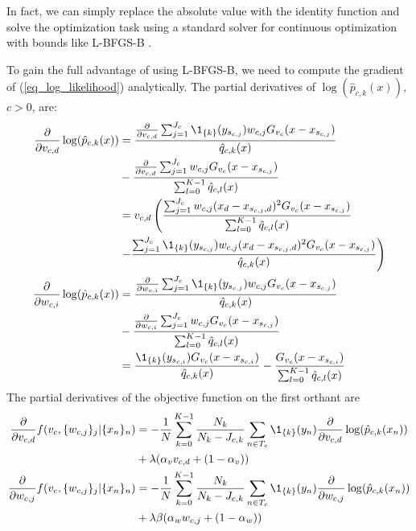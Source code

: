 In fact, we can simply replace the absolute value with the identity function and solve the optimization task using a standard solver for continuous optimization with bounds like L-BFGS-B \cite{Byrd_95}.\par
%
To gain the full advantage of using L-BFGS-B, we need to compute the gradient of (\ref{eq_log_likelihood}) analytically.
The partial derivatives of $\log(\hat{p}_{c,k}(x))$, $c>0$, are:
%
\begin{align}
\frac{\partial}{\partial v_{c,d}}\log(\hat{p}_{c,k}(x))&
=\frac{\frac{\partial}{\partial v_{c,d}}
\sum_{j=1}^{J_c}\1_{\{k\}}(y_{s_{c,j}})w_{c,j}G_{v_c}(x-x_{s_{c,j}})}
{\hat{q}_{c,k}(x)}
\label{eq_p_partial_v}\\
&-\frac{\frac{\partial}{\partial v_{c,d}}
\sum_{j=1}^{J_c}w_{c,j}G_{v_c}(x-x_{s_{c,j}})}
{\sum_{l=0}^{K-1}\hat{q}_{c,l}(x)}\notag\\
&=v_{c,d}\left(\frac{\sum_{j=1}^{J_c}w_{c,j}
(x_d-x_{s_{c,j},d})^2G_{v_c}(x-x_{s_{c,j}})}
{\sum_{l=0}^{K-1}\hat{q}_{c,l}(x)}\right.\notag\\
&\left.-\frac{\sum_{j=1}^{J_c}\1_{\{k\}}(y_{s_{c,j}})w_{c,j}
(x_d-x_{s_{c,j},d})^2G_{v_c}(x-x_{s_{c,j}})}
{\hat{q}_{c,k}(x)}\right)\notag\\
\frac{\partial}{\partial w_{c,i}}\log(\hat{p}_{c,k}(x))&
=\frac{\frac{\partial}{\partial w_{c,i}}
\sum_{j=1}^{J_c}\1_{\{k\}}(y_{s_{c,j}})w_{c,j}G_{v_c}(x-x_{s_{c,j}})}
{\hat{q}_{c,k}(x)}
\label{eq_p_partial_w}\\
&-\frac{\frac{\partial}{\partial w_{c,i}}
\sum_{j=1}^{J_c}w_{c,j}G_{v_c}(x-x_{s_{c,j}})}
{\sum_{l=0}^{K-1}\hat{q}_{c,l}(x)}\notag\\
&=\frac{\1_{\{k\}}(y_{s_{c,i}})G_{v_c}(x-x_{s_{c,i}})}
{\hat{q}_{c,k}(x)}
-\frac{G_{v_c}(x-x_{s_{c,i}})}
{\sum_{l=0}^{K-1}\hat{q}_{c,l}(x)}\notag
\end{align}
%
The partial derivatives of the objective function on the first orthant are
%
\begin{align}
\frac{\partial}{\partial v_{c,d}}f(v_c,\{w_{c,j}\}_j|\{x_n\}_n)
&=-\frac{1}{N}\sum_{k=0}^{K-1}\frac{N_k}{N_k-J_{c,k}}\sum_{n\in T_c}
\1_{\{k\}}(y_n)\frac{\partial}{\partial v_{c,d}}\log(\hat{p}_{c,k}(x_n))
\label{eq_l_partial_v}\\
&+\lambda(\alpha_v v_{c,d}+(1-\alpha_v))\notag\\
\frac{\partial}{\partial w_{c,j}}f(v_c,\{w_{c,j}\}_j|\{x_n\}_n)
&=-\frac{1}{N}\sum_{k=0}^{K-1}\frac{N_k}{N_k-J_{c,k}}\sum_{n\in T_c}
\1_{\{k\}}(y_n)\frac{\partial}{\partial w_{c,j}}\log(\hat{p}_{c,k}(x_n))
\label{eq_l_partial_w}\\
&+\lambda\beta(\alpha_w w_{c,j}+(1-\alpha_w))\notag
\end{align}
